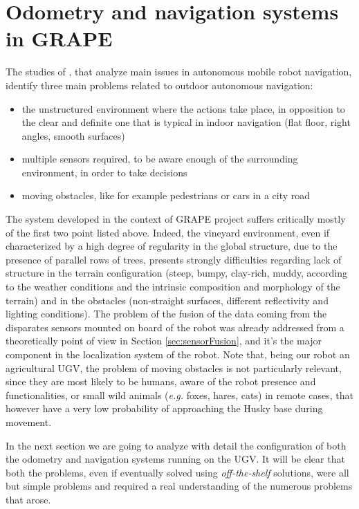 
\chapter{Odometry and navigation systems in GRAPE} \label{chap:localization}

The studies of \cite{outdoorNavigation}, that analyze main issues in autonomous mobile robot navigation, identify three main problems related to outdoor autonomous navigation:
\begin{itemize}
	\item the unstructured environment where the actions take place, in opposition to the clear and definite one that is typical in indoor navigation (flat floor, right angles, smooth surfaces)
	\item multiple sensors required, to be aware enough of the surrounding environment, in order to take decisions
	\item moving obstacles, like for example pedestrians or cars in a city road
\end{itemize}
The system developed in the context of \ac{GRAPE} project suffers critically mostly of the first two point listed above. Indeed, the vineyard environment, even if characterized by a high degree of regularity in the global structure, due to the presence of parallel rows of trees, presents strongly difficulties regarding lack of structure in the terrain configuration (steep, bumpy, clay-rich, muddy, according to the weather conditions and the intrinsic composition and morphology of the terrain) and in the obstacles (non-straight surfaces, different reflectivity and lighting conditions). The problem of the fusion of the data coming from the disparates sensors mounted on board of the robot was already addressed from a theoretically point of view in Section \ref{sec:sensorFusion}, and it's the major component in the localization system of the robot. Note that, being our robot an agricultural \ac{UGV}, the problem of moving obstacles is not particularly relevant, since they are most likely to be humans, aware of the robot presence and functionalities, or small wild animals (\textit{e.g.} foxes, hares, cats) in remote cases, that however have a very low probability of approaching the Husky base during movement.

\par In the next section we are going to analyze with detail the configuration of both the odometry and navigation systems running on the \ac{UGV}. It will be clear that both the problems, even if eventually solved using \textit{off-the-shelf} solutions, were all but simple problems and required a real understanding of the numerous problems that arose.


